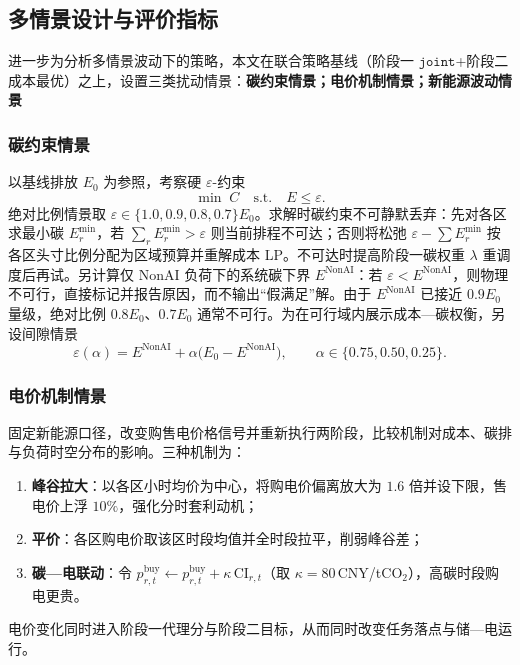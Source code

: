\documentclass[UTF8,a4paper,zihao=-4]{ctexart}
\begin{document}
\subsection{多情景设计与评价指标}

进一步为分析多情景波动下的策略，本文在联合策略基线（阶段一 $\texttt{joint}$+阶段二成本最优）之上，设置三类扰动情景：\textbf{碳约束情景；电价机制情景；新能源波动情景}

\subsubsection{碳约束情景}

以基线排放 $E_0$ 为参照，考察硬 $\varepsilon$-约束
\begin{equation}
\min\; C
\quad
\mathrm{s.t.}
\quad
E\le\varepsilon.
\end{equation}
绝对比例情景取 $\varepsilon\in\{1.0,0.9,0.8,0.7\}E_0$。求解时碳约束不可静默丢弃：先对各区求最小碳 $E^{\min}_r$，若 $\sum_r E^{\min}_r>\varepsilon$ 则当前排程不可达；否则将松弛 $\varepsilon-\sum E^{\min}_r$ 按各区头寸比例分配为区域预算并重解成本 LP。不可达时提高阶段一碳权重 $\lambda$ 重调度后再试。另计算仅 NonAI 负荷下的系统碳下界 $E^{\mathrm{NonAI}}$：若 $\varepsilon<E^{\mathrm{NonAI}}$，则物理不可行，直接标记并报告原因，而不输出“假满足”解。由于 $E^{\mathrm{NonAI}}$ 已接近 $0.9E_0$ 量级，绝对比例 $0.8E_0$、$0.7E_0$ 通常不可行。为在可行域内展示成本—碳权衡，另设间隙情景
\begin{equation}
\varepsilon(\alpha)=E^{\mathrm{NonAI}}+\alpha\bigl(E_0-E^{\mathrm{NonAI}}\bigr),
\qquad
\alpha\in\{0.75,0.50,0.25\}.
\end{equation}

\subsubsection{电价机制情景}

固定新能源口径，改变购售电价格信号并重新执行两阶段，比较机制对成本、碳排与负荷时空分布的影响。三种机制为：
\begin{enumerate}
\item \textbf{峰谷拉大}：以各区小时均价为中心，将购电价偏离放大为 $1.6$ 倍并设下限，售电价上浮 $10\%$，强化分时套利动机；
\item \textbf{平价}：各区购电价取该区时段均值并全时段拉平，削弱峰谷差；
\item \textbf{碳—电联动}：令 $p^{\mathrm{buy}}_{r,t}\leftarrow p^{\mathrm{buy}}_{r,t}+\kappa\,\mathrm{CI}_{r,t}$（取 $\kappa=80$\,CNY/tCO$_2$），高碳时段购电更贵。
\end{enumerate}
电价变化同时进入阶段一代理分与阶段二目标，从而同时改变任务落点与储—电运行。
\end{document}
